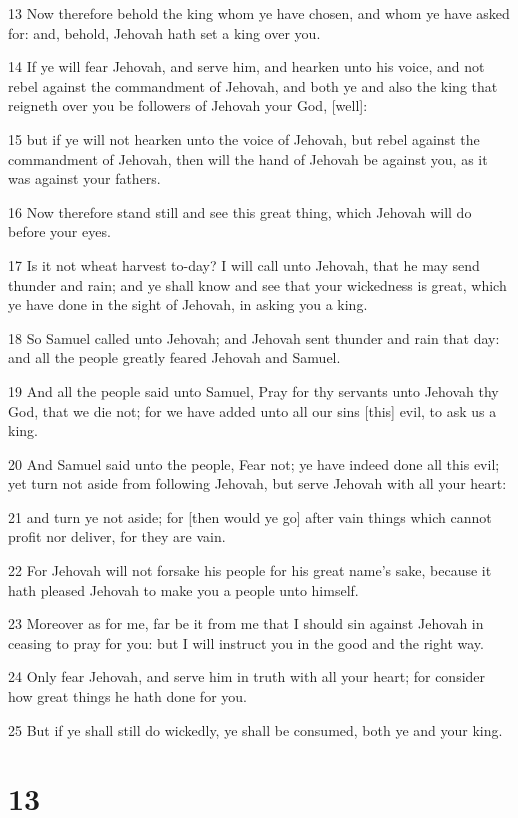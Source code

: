 \par 13 Now therefore behold the king whom ye have chosen, and whom ye have asked for: and, behold, Jehovah hath set a king over you.
\par 14 If ye will fear Jehovah, and serve him, and hearken unto his voice, and not rebel against the commandment of Jehovah, and both ye and also the king that reigneth over you be followers of Jehovah your God, [well]:
\par 15 but if ye will not hearken unto the voice of Jehovah, but rebel against the commandment of Jehovah, then will the hand of Jehovah be against you, as it was against your fathers.
\par 16 Now therefore stand still and see this great thing, which Jehovah will do before your eyes.
\par 17 Is it not wheat harvest to-day? I will call unto Jehovah, that he may send thunder and rain; and ye shall know and see that your wickedness is great, which ye have done in the sight of Jehovah, in asking you a king.
\par 18 So Samuel called unto Jehovah; and Jehovah sent thunder and rain that day: and all the people greatly feared Jehovah and Samuel.
\par 19 And all the people said unto Samuel, Pray for thy servants unto Jehovah thy God, that we die not; for we have added unto all our sins [this] evil, to ask us a king.
\par 20 And Samuel said unto the people, Fear not; ye have indeed done all this evil; yet turn not aside from following Jehovah, but serve Jehovah with all your heart:
\par 21 and turn ye not aside; for [then would ye go] after vain things which cannot profit nor deliver, for they are vain.
\par 22 For Jehovah will not forsake his people for his great name's sake, because it hath pleased Jehovah to make you a people unto himself.
\par 23 Moreover as for me, far be it from me that I should sin against Jehovah in ceasing to pray for you: but I will instruct you in the good and the right way.
\par 24 Only fear Jehovah, and serve him in truth with all your heart; for consider how great things he hath done for you.
\par 25 But if ye shall still do wickedly, ye shall be consumed, both ye and your king.

\chapter{13}

